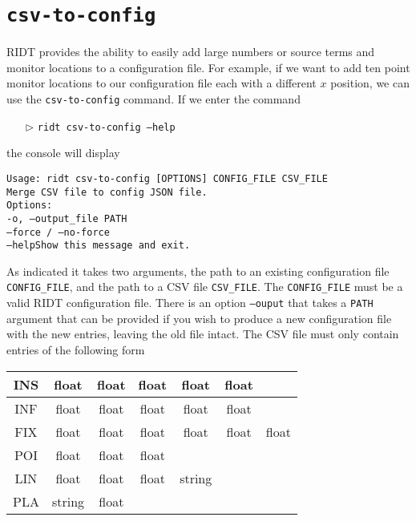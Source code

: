 \documentclass[]{article}
\def\code#1{\texttt{#1}}
\def\HS{\hspace{\fontdimen2\font}}
\begin{document}
\section{\code{csv-to-config}}
RIDT provides the ability to easily add large numbers or source terms and
monitor locations to a configuration file. For example, if we want to add ten
point monitor locations to our configuration file each with a different $x$
position, we can use the \code{csv-to-config} command. If we enter the command
\begin{itemize}
    \item[$\triangleright$] \code{ridt csv-to-config --help}
\end{itemize}
the console will display\\
\begin{addmargin}[1.5em]{1em}

\begin{tcolorbox}[enhanced,width=6in,fontupper=\bfseries,drop shadow
southwest,sharp corners, before upper={\parindent15pt}]
\noindent\code{Usage: ridt csv-to-config [OPTIONS] CONFIG\_FILE CSV\_FILE}\\

\indent\code{Merge CSV file to config JSON file.}\\

\noindent\code{Options:}\\
\indent\code{-o, --output\_file PATH}\\
\indent\code{--force / --no-force}\\
\indent\code{--help\HS\HS\HS\HS\HS\HS\HS\HS\HS\HS\HS\HS\HS\HS Show this message and exit.}
\end{tcolorbox}
\end{addmargin}
\medskip

\noindent As indicated it takes two arguments, the path to an existing
configuration file \code{CONFIG\_FILE}, and the path to a CSV file
\code{CSV\_FILE}. The \code{CONFIG\_FILE} must be a valid RIDT configuration
file. There is an option \code{--ouput} that takes a \code{PATH} argument that
can be provided if you wish to produce a new configuration file with the new
entries, leaving the old file intact. The CSV file must only contain entries of
the following form

\begin{center}
    \begin{tabular}{|c|c|c|c|c|c|c|}\hline
        INS & float & float & float & float & float & \\\hline
        INF & float & float & float & float & float & \\\hline
        FIX & float & float & float & float & float & float \\\hline
        POI & float & float & float &  &  & \\\hline
        LIN & float & float & float & string &  & \\\hline
        PLA & string & float &  &  &  & \\\hline
    \end{tabular}
\end{center}
\end{document}

